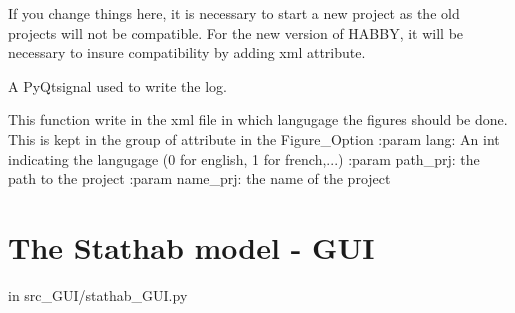 \documentclass[letterpaper,10pt,english]{sphinxmanual}
\begin{document}
\begin{fulllineitems}
\begin{fulllineitems}
If you change things here, it is necessary to start a new project as the old projects will not be compatible.
For the new version of HABBY, it will be necessary to insure compatibility by adding xml attribute.

\end{fulllineitems}


\begin{fulllineitems}
\label{\detokenize{index:src_GUI.output_fig_GUI.outputW.send_log}}
A PyQtsignal used to write the log.

\end{fulllineitems}


\end{fulllineitems}


\begin{fulllineitems}
\label{\detokenize{index:src_GUI.output_fig_GUI.set_lang_fig}}
This function write in the xml file in which langugage the figures should be done. This is kept in the
group of attribute in the Figure\_Option
:param lang: An int indicating the langugage (0 for english, 1 for french,...)
:param path\_prj: the path to the project
:param name\_prj: the name of the project

\end{fulllineitems}



\section{The Stathab model - GUI}
\label{\detokenize{index:the-stathab-model-gui}}
in src\_GUI/stathab\_GUI.py
\label{\detokenize{index:module-src_GUI.stathab_GUI}}
\end{document}
